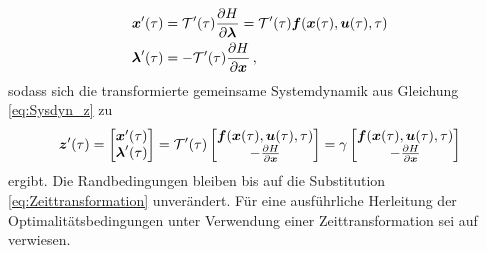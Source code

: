\begin{align}
\boldsymbol{x}'(\tau) &= \mathcal{T}'(\tau)\frac{\partial H}{\partial\boldsymbol{\lambda}} = \mathcal{T}'(\tau)\boldsymbol{f}(\boldsymbol{x}(\tau),\boldsymbol{u}(\tau),\tau) \label{eq:Zustandsdgl_tau} \\
\boldsymbol{\lambda}'(\tau) &= -\mathcal{T}'(\tau)\frac{\partial H}{\partial \boldsymbol{x}}\,, \label{eq:Adjdgl_tau} 
\end{align}
sodass sich die transformierte gemeinsame Systemdynamik aus Gleichung \eqref{eq:Sysdyn_z} zu 
\begin{equation}
	\boldsymbol{z}'(\tau) = \begin{bmatrix}
	\boldsymbol{x}'(\tau) \\
	\boldsymbol{\lambda}'(\tau)
	\end{bmatrix} = \mathcal{T}'(\tau)
	\begin{bmatrix}
	\boldsymbol{f}(\boldsymbol{x}(\tau),\boldsymbol{u}(\tau),\tau) \\
	-\frac{\partial H}{\partial \boldsymbol{x}}
	\end{bmatrix} = 
	\gamma
	\begin{bmatrix}
	\boldsymbol{f}(\boldsymbol{x}(\tau),\boldsymbol{u}(\tau),\tau) \\
	-\frac{\partial H}{\partial \boldsymbol{x}}
	\end{bmatrix} \label{eq:Sysdyn_z_tau}
\end{equation} 
ergibt. Die Randbedingungen bleiben bis auf die Substitution \eqref{eq:Zeittransformation} unverändert. Für eine ausführliche Herleitung der Optimalitätsbedingungen unter Verwendung einer Zeittransformation sei auf \cite{Gerdts.2010} verwiesen.

